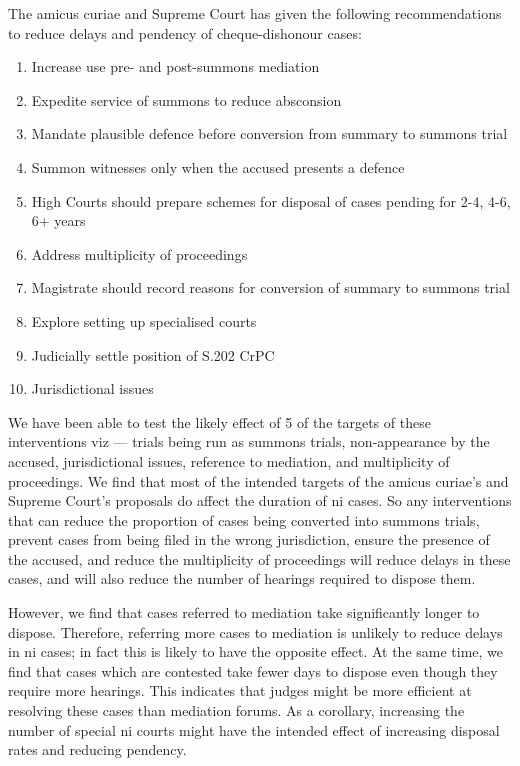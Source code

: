 The amicus curiae and Supreme Court has given the following recommendations to reduce delays and pendency of cheque-dishonour cases:
\begin{enumerate}
\item Increase use pre- and post-summons mediation
\item Expedite service of summons to reduce absconsion
\item Mandate plausible defence before conversion from summary to summons trial
\item Summon witnesses only when the accused presents a defence
\item High Courts should prepare schemes for disposal of cases pending for 2-4, 4-6, 6+ years
\item Address multiplicity of proceedings
\item Magistrate should record reasons for conversion of summary to summons trial
\item Explore setting up specialised courts
\item Judicially settle position of S.202 CrPC
\item Jurisdictional issues
\end{enumerate}

We have been able to test the likely effect of 5 of the targets of these interventions viz --- trials being run as summons trials, non-appearance by the accused, jurisdictional issues, reference to mediation, and multiplicity of proceedings. We find that most of the intended targets of the amicus curiae's and Supreme Court's proposals do affect the duration of \gls{ni} cases. So any interventions that can reduce the proportion of cases being converted into summons trials, prevent cases from being filed in the wrong jurisdiction, ensure the presence of the accused, and reduce the multiplicity of proceedings will reduce delays in these cases, and will also reduce the number of hearings required to dispose them.

However, we find that cases referred to mediation take significantly longer to dispose. Therefore, referring more cases to mediation is unlikely to reduce delays in \gls{ni} cases; in fact this is likely to have the opposite effect. At the same time, we find that cases which are contested take fewer days to dispose even though they require more hearings. This indicates that judges might be more efficient at resolving these cases than mediation forums. As a corollary, increasing the number of special \gls{ni} courts might have the intended effect of increasing disposal rates and reducing pendency.

